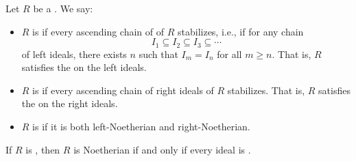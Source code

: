 
\begin{definition} \label{definition:noetherian_ring}
Let $R$ be a . We say:
\begin{itemize}
    \item $R$ is  if every ascending chain of  of $R$ stabilizes, i.e., if for any chain
    $$I_1 \subseteq I_2 \subseteq I_3 \subseteq \cdots$$
    of left ideals, there exists $n$ such that $I_m = I_n$ for all $m \geq n$. That is, $R$ satisfies the  on the left ideals.
    
    \item $R$ is  if every ascending chain of right ideals of $R$ stabilizes. That is, $R$ satisfies the  on the right ideals.

    
    \item $R$ is  if it is both left-Noetherian and right-Noetherian.
\end{itemize}
If $R$ is , then $R$ is Noetherian if and only if every ideal is .
\end{definition}


